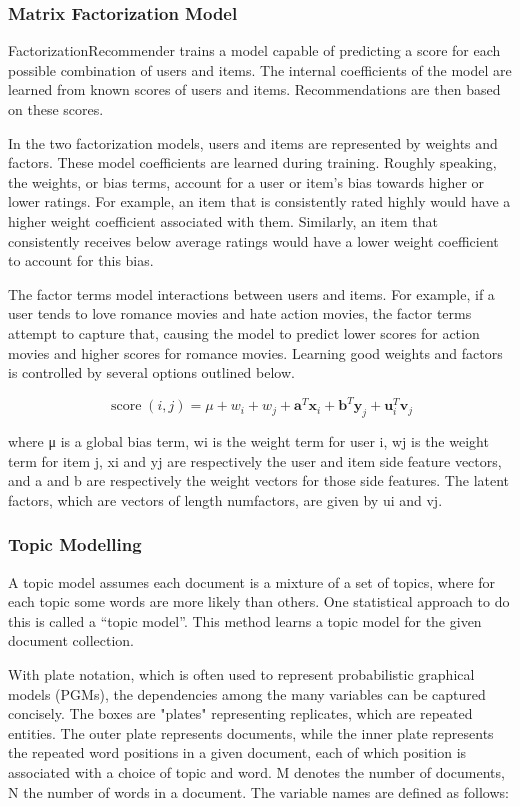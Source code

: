 \subsubsection{Matrix Factorization Model}
FactorizationRecommender trains a model capable of predicting a score for each possible combination of users and items. The internal coefficients of the model are learned from known scores of users and items. Recommendations are then based on these scores.

In the two factorization models, users and items are represented by weights and factors. These model coefficients are learned during training. Roughly speaking, the weights, or bias terms, account for a user or item’s bias towards higher or lower ratings. For example, an item that is consistently rated highly would have a higher weight coefficient associated with them. Similarly, an item that consistently receives below average ratings would have a lower weight coefficient to account for this bias.

The factor terms model interactions between users and items. For example, if a user tends to love romance movies and hate action movies, the factor terms attempt to capture that, causing the model to predict lower scores for action movies and higher scores for romance movies. Learning good weights and factors is controlled by several options outlined below.

\[
  \operatorname{score}(i, j) = \mu + w_i + w_j + \mathbf{a}^T \mathbf{x}_i + \mathbf{b}^T \mathbf{y}_j + {\mathbf u}_i^T {\mathbf v}_j
  \]

where μ is a global bias term, wi is the weight term for user i, wj is the weight term for item j, xi and yj are respectively the user and item side feature vectors, and a and b are respectively the weight vectors for those side features. The latent factors, which are vectors of length numfactors, are given by ui and vj.

\subsubsection{Topic Modelling}

A topic model assumes each document is a mixture of a set of topics, where for each topic some words are more likely than others. One statistical approach to do this is called a “topic model”. This method learns a topic model for the given document collection.

With plate notation, which is often used to represent probabilistic graphical models (PGMs), the dependencies among the many variables can be captured concisely. The boxes are "plates" representing replicates, which are repeated entities. The outer plate represents documents, while the inner plate represents the repeated word positions in a given document, each of which position is associated with a choice of topic and word. M denotes the number of documents, N the number of words in a document. The variable names are defined as follows:

